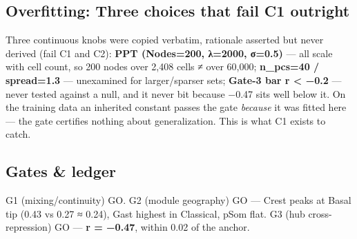 \documentclass[11pt,a4paper]{article}
\begin{document}
\hypertarget{overfitting-three-choices-that-fail-c1-outright}{%
\subsection{Overfitting: Three choices that fail C1 outright}\label{overfitting-three-choices-that-fail-c1-outright}}

Three continuous knobs were copied verbatim, rationale asserted but
never derived (fail C1 and C2): \textbf{PPT (Nodes=200, λ=2000, σ=0.5)}
--- all scale with cell count, so 200 nodes over 2,408 cells ≠ over
60,000; \textbf{n\_pcs=40 / spread=1.3} --- unexamined for
larger/sparser sets; \textbf{Gate-3 bar r \textless{} −0.2} --- never
tested against a null, and it never bit because −0.47 sits well below
it. On the training data an inherited constant passes the gate
\emph{because} it was fitted here --- the gate certifies nothing about
generalization. This is what C1 exists to catch.

\hypertarget{gates-ledger}{%
\subsection{Gates \& ledger}\label{gates-ledger}}

G1 (mixing/continuity) GO. G2 (module geography) GO --- Crest peaks at
Basal tip (0.43 vs 0.27 ≈ 0.24), Gast highest in Classical, pSom flat.
G3 (hub cross-repression) GO --- \textbf{r = −0.47}, within 0.02 of the
anchor.
\end{document}
